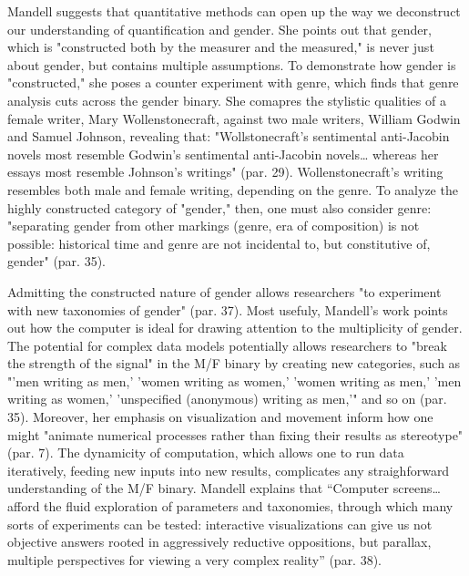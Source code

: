 \documentclass[11pt]{article}
\begin{document}
Mandell suggests that quantitative methods can open up the way we
deconstruct our understanding of quantification and gender. She points
out that gender, which is "constructed both by the measurer and the
measured," is never just about gender, but contains multiple
assumptions. To demonstrate how gender is "constructed," she poses a
counter experiment with genre, which finds that genre analysis cuts
across the gender binary. She comapres the stylistic qualities of a
female writer, Mary Wollenstonecraft, against two male writers,
William Godwin and Samuel Johnson, revealing that: "Wollstonecraft’s
sentimental anti-Jacobin novels most resemble Godwin’s sentimental
anti-Jacobin novels\ldots{} whereas her essays most resemble Johnson’s
writings" (par. 29). Wollenstonecraft's writing resembles both male
and female writing, depending on the genre. To analyze the highly
constructed category of "gender," then, one must also consider genre:
"separating gender from other markings (genre, era of composition) is
not possible: historical time and genre are not incidental to, but
constitutive of, gender" (par. 35).

Admitting the constructed nature of gender allows researchers "to
experiment with new taxonomies of gender" (par. 37). Most usefuly,
Mandell's work points out how the computer is ideal for drawing
attention to the multiplicity of gender. The potential for complex
data models potentially allows researchers to "break the strength of
the signal" in the M/F binary by creating new categories, such as
"'men writing as men,' 'women writing as women,' 'women writing as
men,' 'men writing as women,' 'unspecified (anonymous) writing as
men,'" and so on (par. 35). Moreover, her emphasis on visualization
and movement inform how one might "animate numerical processes rather
than fixing their results as stereotype" (par. 7). The dynamicity of
computation, which allows one to run data iteratively, feeding new
inputs into new results, complicates any straighforward understanding
of the M/F binary. Mandell explains that “Computer screens\ldots{} afford
the fluid exploration of parameters and taxonomies, through which many
sorts of experiments can be tested: interactive visualizations can
give us not objective answers rooted in aggressively reductive
oppositions, but parallax, multiple perspectives for viewing a very
complex reality” (par. 38).
\end{document}
